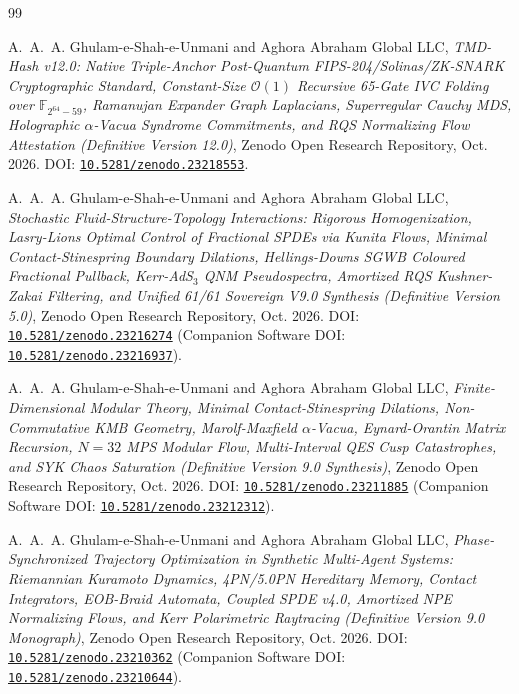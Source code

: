 \documentclass[11pt,a4paper]{article}
\theoremstyle{plain}
\theoremstyle{definition}
\theoremstyle{remark}
\begin{document}
\begin{thebibliography}{99}

A.~A.~A. Ghulam-e-Shah-e-Unmani and Aghora Abraham Global LLC,
\emph{TMD-Hash v12.0: Native Triple-Anchor Post-Quantum FIPS-204/Solinas/ZK-SNARK Cryptographic Standard, Constant-Size $\mathcal{O}(1)$ Recursive 65-Gate IVC Folding over $\mathbb{F}_{2^{64}-59}$, Ramanujan Expander Graph Laplacians, Superregular Cauchy MDS, Holographic $\alpha$-Vacua Syndrome Commitments, and RQS Normalizing Flow Attestation (Definitive Version 12.0)},
Zenodo Open Research Repository, Oct. 2026.
DOI: \href{https://doi.org/10.5281/zenodo.23218553}{\texttt{10.5281/zenodo.23218553}}.

A.~A.~A. Ghulam-e-Shah-e-Unmani and Aghora Abraham Global LLC,
\emph{Stochastic Fluid-Structure-Topology Interactions: Rigorous Homogenization, Lasry-Lions Optimal Control of Fractional SPDEs via Kunita Flows, Minimal Contact-Stinespring Boundary Dilations, Hellings-Downs SGWB Coloured Fractional Pullback, Kerr-AdS$_3$ QNM Pseudospectra, Amortized RQS Kushner-Zakai Filtering, and Unified 61/61 Sovereign V9.0 Synthesis (Definitive Version 5.0)},
Zenodo Open Research Repository, Oct. 2026.
DOI: \href{https://doi.org/10.5281/zenodo.23216274}{\texttt{10.5281/zenodo.23216274}} (Companion Software DOI: \href{https://doi.org/10.5281/zenodo.23216937}{\texttt{10.5281/zenodo.23216937}}).

A.~A.~A. Ghulam-e-Shah-e-Unmani and Aghora Abraham Global LLC,
\emph{Finite-Dimensional Modular Theory, Minimal Contact-Stinespring Dilations, Non-Commutative KMB Geometry, Marolf-Maxfield $\alpha$-Vacua, Eynard-Orantin Matrix Recursion, $N=32$ MPS Modular Flow, Multi-Interval QES Cusp Catastrophes, and SYK Chaos Saturation (Definitive Version 9.0 Synthesis)},
Zenodo Open Research Repository, Oct. 2026.
DOI: \href{https://doi.org/10.5281/zenodo.23211885}{\texttt{10.5281/zenodo.23211885}} (Companion Software DOI: \href{https://doi.org/10.5281/zenodo.23212312}{\texttt{10.5281/zenodo.23212312}}).

A.~A.~A. Ghulam-e-Shah-e-Unmani and Aghora Abraham Global LLC,
\emph{Phase-Synchronized Trajectory Optimization in Synthetic Multi-Agent Systems: Riemannian Kuramoto Dynamics, 4PN/5.0PN Hereditary Memory, Contact Integrators, EOB-Braid Automata, Coupled SPDE v4.0, Amortized NPE Normalizing Flows, and Kerr Polarimetric Raytracing (Definitive Version 9.0 Monograph)},
Zenodo Open Research Repository, Oct. 2026.
DOI: \href{https://doi.org/10.5281/zenodo.23210362}{\texttt{10.5281/zenodo.23210362}} (Companion Software DOI: \href{https://doi.org/10.5281/zenodo.23210644}{\texttt{10.5281/zenodo.23210644}}).


\end{thebibliography}
\end{document}
